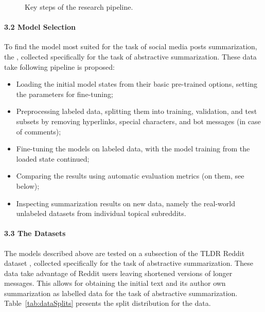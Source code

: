 \begin{figure}[ht]
	\caption{Key steps of the research pipeline.}\label{fig:keyPipelineSteps}
\end{figure}

\paragraph{3.2 Model Selection}
To find the model most suited for the task of social media posts summarization, the \cite{VolskePotthastSyed}, collected specifically for the task of abstractive summarization. These data take following pipeline is proposed:

\begin{itemize}
	\item Loading the initial model states from their basic pre-trained options, setting the parameters for fine-tuning;
	\item Preprocessing labeled data, splitting them into training, validation, and test subsets by removing hyperlinks, special characters, and bot messages (in case of comments);
	\item Fine-tuning the models on labeled data, with the model training from the loaded state continued;
	\item Comparing the results using automatic evaluation metrics (on them, see below); 
	\item Inspecting summarization results on new data, namely the real-world unlabeled datasets from individual topical subreddits.
\end{itemize}

\paragraph{3.3 The Datasets}
The models described above are tested on a subsection of the TLDR Reddit dataset \cite{VolskePotthastSyed}, collected specifically for the task of abstractive summarization. These data take advantage of Reddit users leaving shortened versions of longer messages. This allows for obtaining the initial text and its author own summarization as labelled data for the task of abstractive summarization. Table~\cref{tab:dataSplits} presents the split distribution for the data.

